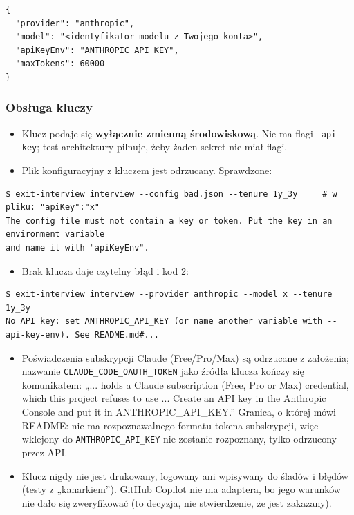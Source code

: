 {\begin{Verbatim}[fontsize=\scriptsize,frame=single,framesep=2mm]
{
  "provider": "anthropic",
  "model": "<identyfikator modelu z Twojego konta>",
  "apiKeyEnv": "ANTHROPIC_API_KEY",
  "maxTokens": 60000
}
\end{Verbatim}

\subsubsection{Obsługa kluczy}

\begin{itemize}[leftmargin=*,itemsep=2pt]
  \item Klucz podaje się \textbf{wyłącznie zmienną środowiskową}. Nie ma flagi
        \texttt{--api-key}; test architektury pilnuje, żeby żaden sekret nie
        miał flagi.
  \item Plik konfiguracyjny z kluczem jest odrzucany. Sprawdzone:
\end{itemize}

\begin{Verbatim}[fontsize=\scriptsize,frame=single,framesep=2mm]
$ exit-interview interview --config bad.json --tenure 1y_3y     # w pliku: "apiKey":"x"
The config file must not contain a key or token. Put the key in an environment variable
and name it with "apiKeyEnv".
\end{Verbatim}

\begin{itemize}[leftmargin=*,itemsep=2pt]
  \item Brak klucza daje czytelny błąd i kod 2:
\end{itemize}

\begin{Verbatim}[fontsize=\scriptsize,frame=single,framesep=2mm]
$ exit-interview interview --provider anthropic --model x --tenure 1y_3y
No API key: set ANTHROPIC_API_KEY (or name another variable with --api-key-env). See README.md#...
\end{Verbatim}

\begin{itemize}[leftmargin=*,itemsep=2pt]
  \item Poświadczenia subskrypcji Claude (Free/Pro/Max) są odrzucane z
        założenia; nazwanie \texttt{CLAUDE\_\allowbreak{}CODE\_\allowbreak{}OAUTH\_\allowbreak{}TOKEN} jako źródła
        klucza kończy się komunikatem: „... holds a Claude subscription (Free, Pro
        or Max) credential, which this project refuses to use ... Create an API
        key in the Anthropic Console and put it in ANTHROPIC\_API\_KEY.” Granica,
        o której mówi README: nie ma rozpoznawalnego formatu tokena subskrypcji,
        więc wklejony do \texttt{ANTHROPIC\_\allowbreak{}API\_\allowbreak{}KEY} nie zostanie rozpoznany, tylko
        odrzucony przez API.
  \item Klucz nigdy nie jest drukowany, logowany ani wpisywany do śladów i błędów
        (testy z „kanarkiem”). GitHub Copilot nie ma adaptera, bo jego warunków nie
        dało się zweryfikować (to decyzja, nie stwierdzenie, że jest zakazany).
\end{itemize}

}
